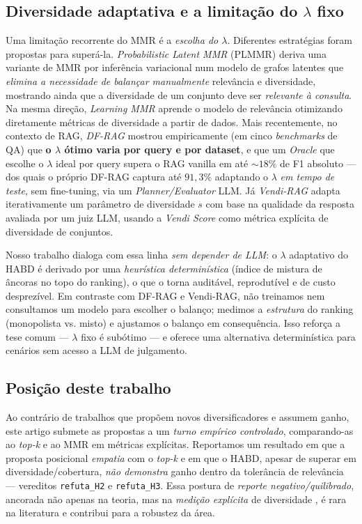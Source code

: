 \subsection{Diversidade adaptativa e a limitação do $\lambda$ fixo}

Uma limitação recorrente do MMR é a \emph{escolha do $\lambda$}. Diferentes
estratégias foram propostas para superá-la. \emph{Probabilistic Latent MMR}
(PLMMR) \citep{GuoSanner2010PLMMR} deriva uma variante de MMR por inferência
variacional num modelo de grafos latentes que \emph{elimina a necessidade de
balançar manualmente} relevância e diversidade, mostrando ainda que a diversidade
de um conjunto deve ser \emph{relevante à consulta}. Na mesma direção,
\emph{Learning MMR} \citep{Xia2015LearningMMR} aprende o modelo de relevância
otimizando diretamente métricas de diversidade a partir de dados. Mais
recentemente, no contexto de RAG, \emph{DF-RAG} \citep{Khan2026DFRAG} mostrou
empiricamente (em cinco \emph{benchmarks} de QA) que \textbf{o $\lambda$ ótimo
varia por query e por dataset}, e que um \emph{Oracle} que escolhe o $\lambda$
ideal por query supera o RAG vanilla em até $\sim 18\%$ de F1 absoluto — dos quais
o próprio DF-RAG captura até $91{,}3\%$ adaptando o $\lambda$ \emph{em tempo de
teste}, sem fine-tuning, via um \emph{Planner/Evaluator} LLM. Já \emph{Vendi-RAG}
\citep{RezaeiDieng2025VendiRAG} adapta iterativamente um parâmetro de diversidade
$s$ com base na qualidade da resposta avaliada por um juiz LLM, usando a
\emph{Vendi Score} como métrica explícita de diversidade de conjuntos.

Nosso trabalho dialoga com essa linha \emph{sem depender de LLM}: o
$\lambda$ adaptativo do HABD é derivado por uma \emph{heurística determinística}
(índice de mistura de âncoras no topo do ranking), o que o torna auditável,
reprodutível e de custo desprezível. Em contraste com DF-RAG e Vendi-RAG, não
treinamos nem consultamos um modelo para escolher o balanço; medimos a
\emph{estrutura} do ranking (monopolista vs. misto) e ajustamos o balanço em
consequência. Isso reforça a tese comum — $\lambda$ fixo é subótimo — e oferece
uma alternativa determinística para cenários sem acesso a LLM de julgamento.

\subsection{Posição deste trabalho}

Ao contrário de trabalhos que propõem novos diversificadores e assumem ganho,
este artigo submete as propostas a um \emph{turno empírico controlado},
comparando-as ao \emph{top-k} e ao MMR em métricas explícitas. Reportamos um
resultado em que a proposta posicional \emph{empatia} com o \emph{top-k} e em que
o HABD, apesar de superar em diversidade/cobertura, \emph{não demonstra} ganho
dentro da tolerância de relevância — vereditos \texttt{refuta\_H2} e
\texttt{refuta\_H3}. Essa postura de \emph{reporte negativo/quilibrado}, ancorada
não apenas na teoria, mas na \emph{medição explícita} de diversidade
\citep{Yu2024RAGEvalSurvey}, é rara na literatura e contribui para a robustez da
área.
